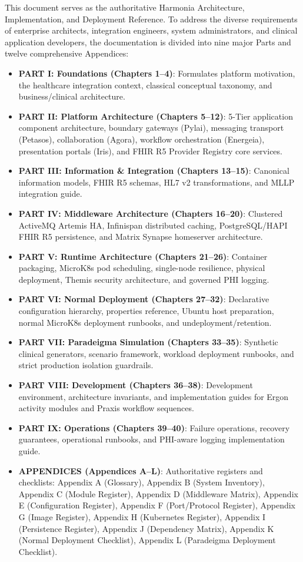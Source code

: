 This document serves as the authoritative Harmonia Architecture, Implementation, and Deployment Reference. To address the diverse requirements of enterprise architects, integration engineers, system administrators, and clinical application developers, the documentation is divided into nine major Parts and twelve comprehensive Appendices:

\begin{itemize}
    \item \textbf{PART I: Foundations (Chapters 1--4)}: Formulates platform motivation, the healthcare integration context, classical conceptual taxonomy, and business/clinical architecture.
    \item \textbf{PART II: Platform Architecture (Chapters 5--12)}: 5-Tier application component architecture, boundary gateways (Pylai), messaging transport (Petasos), collaboration (Agora), workflow orchestration (Energeia), presentation portals (Iris), and FHIR R5 Provider Registry core services.
    \item \textbf{PART III: Information \& Integration (Chapters 13--15)}: Canonical information models, FHIR R5 schemas, HL7 v2 transformations, and MLLP integration guide.
    \item \textbf{PART IV: Middleware Architecture (Chapters 16--20)}: Clustered ActiveMQ Artemis HA, Infinispan distributed caching, PostgreSQL/HAPI FHIR R5 persistence, and Matrix Synapse homeserver architecture.
    \item \textbf{PART V: Runtime Architecture (Chapters 21--26)}: Container packaging, MicroK8s pod scheduling, single-node resilience, physical deployment, Themis security architecture, and governed PHI logging.
    \item \textbf{PART VI: Normal Deployment (Chapters 27--32)}: Declarative configuration hierarchy, properties reference, Ubuntu host preparation, normal MicroK8s deployment runbooks, and undeployment/retention.
    \item \textbf{PART VII: Paradeigma Simulation (Chapters 33--35)}: Synthetic clinical generators, scenario framework, workload deployment runbooks, and strict production isolation guardrails.
    \item \textbf{PART VIII: Development (Chapters 36--38)}: Development environment, architecture invariants, and implementation guides for Ergon activity modules and Praxis workflow sequences.
    \item \textbf{PART IX: Operations (Chapters 39--40)}: Failure operations, recovery guarantees, operational runbooks, and PHI-aware logging implementation guide.
    \item \textbf{APPENDICES (Appendices A--L)}: Authoritative registers and checklists: Appendix A (Glossary), Appendix B (System Inventory), Appendix C (Module Register), Appendix D (Middleware Matrix), Appendix E (Configuration Register), Appendix F (Port/Protocol Register), Appendix G (Image Register), Appendix H (Kubernetes Register), Appendix I (Persistence Register), Appendix J (Dependency Matrix), Appendix K (Normal Deployment Checklist), Appendix L (Paradeigma Deployment Checklist).
\end{itemize}

